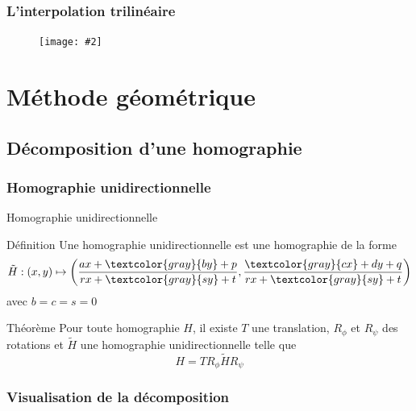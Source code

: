 \documentclass[c,12pt]{beamer}
\newcommand{\image}[2]{\begin{figure} \texttt{[image: \#2]}\end{figure}}
\newcommand{\gray}{\textcolor{gray}}
\newcommand{\fram}[2]{\begin{frame} \frametitle{#1} #2 \end{frame}}
\begin{document}
 
 \fram{L'interpolation trilinéaire}{\image{0.5}{intertri.jpg}}
 
     
     
     
    
     
     
     
     
     
     
     
     
     
     
\section{Méthode géométrique}
 
 \subsection{Décomposition d'une homographie}

  \subsubsection{Homographie unidirectionnelle}

  \begin{frame}{Homographie unidirectionnelle}
   \begin{block}{Définition}
    Une homographie unidirectionnelle est une homographie de la forme
    \[\tilde H : (x,y) \mapsto \left(\frac{ax+\gray{by}+p}{rx+\gray{sy}+t},\frac{\gray{cx}+dy+q}{rx+\gray{sy}+t}\right)\]
    avec $b=c=s=0$
   \end{block}
   \begin{block}{Théorème}
    Pour toute homographie $H$, il existe $T$ une translation, $R_\phi$ et $R_\psi$ des rotations et $\tilde H$ une homographie unidirectionnelle telle que
    \[H = T R_\phi \tilde H R_\psi\]
   \end{block}
  \end{frame}
  

  
\subsubsection{Visualisation de la décomposition}
\end{document}
